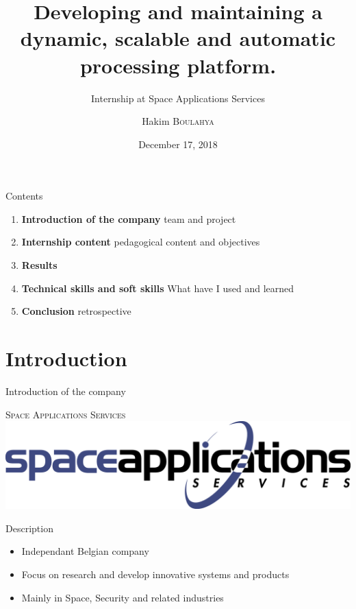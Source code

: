 \documentclass[10pt]{beamer}
\title{Developing and maintaining a dynamic, scalable and automatic processing
platform.}  %
\subtitle{Internship at Space Applications Services}
\date{December 17, 2018}
\author{
  Hakim \textsc{Boulahya}
}
\institute[
  Faculty of Science
  Université Libre de Bruxelles
  Belgium
] %
{%
    Company Supervisor:
    \textbf{Bernard Valentin} \\
    Academic Supervisor:
    \textbf{Gille Geeraerts} \\~\\

  Département d'Informatique \\
  Université Libre de Bruxelles

}
\begin{document}
{\aauwavesbg%
\begin{frame} %
  \titlepage
\end{frame}}

\begin{frame}{Contents}{}

\begin{block}{}
  \begin{enumerate}
    \item \textcolor{firstcolor}{\textbf{Introduction of the company}}
     team and project
     \item \textcolor{firstcolor}{\textbf{Internship content}}
     pedagogical content and objectives
     \item \textcolor{firstcolor}{\textbf{Results}}
     \item \textcolor{firstcolor}{\textbf{Technical skills and soft skills}}
     What have I used and learned
     \item \textcolor{firstcolor}{\textbf{Conclusion}}
     retrospective
  \end{enumerate}
\end{block}

\end{frame}

\section{Introduction}
\begin{frame}{Introduction of the company}{}
  \begin{block}{\textsc{Space Applications Services}}
    \includegraphics[scale=0.3]{img/logoSA}
   \end{block}
    \begin{block}{Description}
        \begin{itemize}
            \item Independant Belgian company
            \item Focus on research and develop innovative systems and products
            \item Mainly in Space, Security and related industries
        \end{itemize}
    \end{block}

\end{frame}
\end{document}
